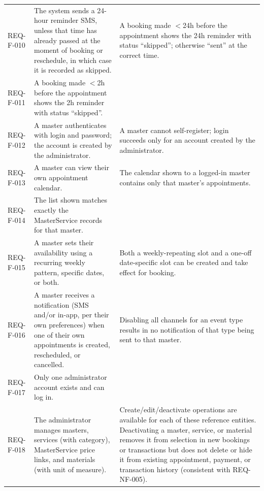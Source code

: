 \documentclass[11pt,a4paper]{article}
\begin{document}
\begin{longtable}{L{1.9cm}L{6.4cm}L{6.2cm}}
REQ-F-010 &
The system sends a 24-hour reminder SMS, unless that time has already
passed at the moment of booking or reschedule, in which case it is
recorded as skipped. &
A booking made $<$24h before the appointment shows the 24h reminder with
status ``skipped''; otherwise ``sent'' at the correct time. \\

REQ-F-011 &
A booking made $<$2h before the appointment shows the 2h reminder with
status ``skipped''. \\

REQ-F-012 &
A master authenticates with login and password; the account is created by
the administrator. &
A master cannot self-register; login succeeds only for an account created
by the administrator.  \\

REQ-F-013 &
A master can view their own appointment calendar. &
The calendar shown to a logged-in master contains only that master's
appointments. \\

REQ-F-014 &
The list shown matches exactly the MasterService records for that master. \\

REQ-F-015 &
A master sets their availability using a recurring weekly pattern,
specific dates, or both. &
Both a weekly-repeating slot and a one-off date-specific slot can be
created and take effect for booking.  \\

REQ-F-016 &
A master receives a notification (SMS and/or in-app, per their own
preferences) when one of their own appointments is created, rescheduled,
or cancelled. &
Disabling all channels for an event type results in no notification of
that type being sent to that master. \\

REQ-F-017 &
Only one administrator account exists and can log in. \\

REQ-F-018 &
The administrator manages masters, services (with category), MasterService
price links, and materials (with unit of measure). &
Create/edit/deactivate operations are available for each of these
reference entities. Deactivating a master, service, or material removes
it from selection in new bookings or transactions but does not delete or
hide it from existing appointment, payment, or transaction history
(consistent with REQ-NF-005).  \\


\end{longtable}
\end{document}
